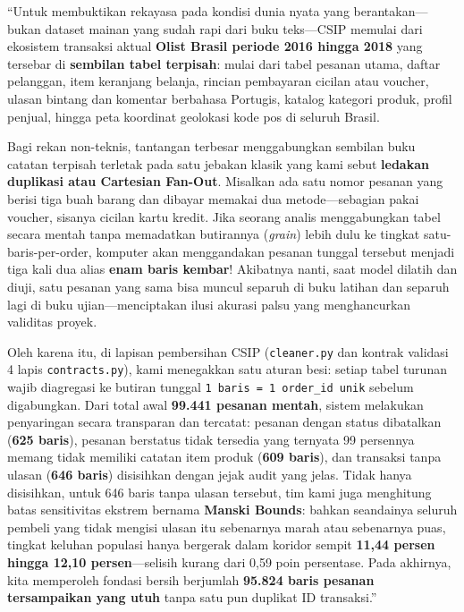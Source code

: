 \documentclass[11pt,a4paper,oneside]{book}
\newcommand{\code}[1]{{\small\nolinkurl{#1}}}
\begin{document}
\begin{scriptbox}
``Untuk membuktikan rekayasa pada kondisi dunia nyata yang berantakan---bukan dataset mainan yang sudah rapi dari buku teks---CSIP memulai dari ekosistem transaksi aktual \textbf{Olist Brasil periode 2016 hingga 2018} yang tersebar di \textbf{sembilan tabel terpisah}: mulai dari tabel pesanan utama, daftar pelanggan, item keranjang belanja, rincian pembayaran cicilan atau voucher, ulasan bintang dan komentar berbahasa Portugis, katalog kategori produk, profil penjual, hingga peta koordinat geolokasi kode pos di seluruh Brasil.

Bagi rekan non-teknis, tantangan terbesar menggabungkan sembilan buku catatan terpisah terletak pada satu jebakan klasik yang kami sebut \textbf{ledakan duplikasi atau Cartesian Fan-Out}. Misalkan ada satu nomor pesanan yang berisi tiga buah barang dan dibayar memakai dua metode---sebagian pakai voucher, sisanya cicilan kartu kredit. Jika seorang analis menggabungkan tabel secara mentah tanpa memadatkan butirannya (\emph{grain}) lebih dulu ke tingkat satu-baris-per-order, komputer akan menggandakan pesanan tunggal tersebut menjadi tiga kali dua alias \textbf{enam baris kembar}! Akibatnya nanti, saat model dilatih dan diuji, satu pesanan yang sama bisa muncul separuh di buku latihan dan separuh lagi di buku ujian---menciptakan ilusi akurasi palsu yang menghancurkan validitas proyek.

Oleh karena itu, di lapisan pembersihan CSIP (\code{cleaner.py} dan kontrak validasi 4 lapis \code{contracts.py}), kami menegakkan satu aturan besi: setiap tabel turunan wajib diagregasi ke butiran tunggal \code{1 baris = 1 order_id unik} sebelum digabungkan. Dari total awal \textbf{99.441 pesanan mentah}, sistem melakukan penyaringan secara transparan dan tercatat: pesanan dengan status dibatalkan (\textbf{625 baris}), pesanan berstatus tidak tersedia yang ternyata 99 persennya memang tidak memiliki catatan item produk (\textbf{609 baris}), dan transaksi tanpa ulasan (\textbf{646 baris}) disisihkan dengan jejak audit yang jelas. Tidak hanya disisihkan, untuk 646 baris tanpa ulasan tersebut, tim kami juga menghitung batas sensitivitas ekstrem bernama \textbf{Manski Bounds}: bahkan seandainya seluruh pembeli yang tidak mengisi ulasan itu sebenarnya marah atau sebenarnya puas, tingkat keluhan populasi hanya bergerak dalam koridor sempit \textbf{11,44 persen hingga 12,10 persen}---selisih kurang dari 0,59 poin persentase. Pada akhirnya, kita memperoleh fondasi bersih berjumlah \textbf{95.824 baris pesanan tersampaikan yang utuh} tanpa satu pun duplikat ID transaksi.''
\end{scriptbox}
\end{document}
